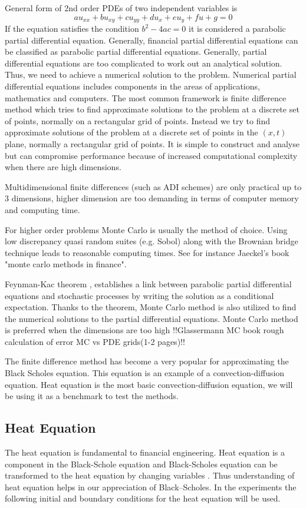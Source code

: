 \documentclass[12pt, oneside]{book}
\theoremstyle{plain}
\theoremstyle{definition}
\begin{document}
General form of 2nd order PDEs of two independent variables is $$ au_{xx} + bu_{xy} + cu_{yy} + du_x + eu_y + fu + g = 0 $$ If the equation satisfies the condition $ b^2 - 4ac = 0 $  it is considered a parabolic partial differential equation. Generally, financial partial differential equations can be classified as parabolic partial differential equations. Generally, partial differential equations are too complicated to work out an analytical solution. Thus, we need to achieve a numerical solution to the problem. Numerical partial differential equations includes components in the areas of applications, mathematics and computers. The most common framework is finite difference method which tries to find approximate solutions to the problem at a discrete set of points, normally on a rectangular grid of points. Instead we try to find approximate solutions of the problem at a discrete set of points in the $(x, t)$ plane, normally a rectangular grid of points. It is simple to construct and analyse but can compromise performance because of increased computational complexity when there are high dimensions. 

Multidimensional finite differences (such as ADI schemes) are only practical up to 3 dimensions, higher dimension are too demanding in terms of computer memory and computing time.

For higher order problems Monte Carlo is usually the method of choice. Using low discrepancy quasi random suites (e.g. Sobol) along with the Brownian bridge technique leads to reasonable computing times. See for instance Jaeckel's book "monte carlo methods in finance".

Feynman-Kac theorem \cite{klebaner}, establishes a link between parabolic partial differential equations and stochastic processes by writing the solution as a conditional expectation. Thanks to the theorem, Monte Carlo method is also utilized to find the numerical solutions to the partial differential equations.  Monte Carlo method is preferred when the dimensions are too high !!Glassermann MC book rough calculation of error MC vs PDE grids(1-2 pages)!!

The finite difference method has become a very popular for approximating the Black Scholes equation. This equation is an example of a convection-diffusion equation. Heat equation is the most basic convection-diffusion equation, we will be using it as a benchmark to test the methods. 

\subsection{Heat Equation}
The heat equation is fundamental to financial engineering. Heat equation is a component in the Black-Schole equation and Black-Scholes equation can be transformed to the heat equation by changing variables \cite{capinski}. Thus understanding  of  heat equation  helps  in  our appreciation of Black–Scholes. In the experiments the following initial and boundary conditions for the heat equation will be used.
\end{document}
